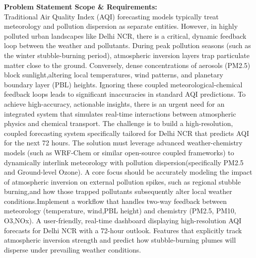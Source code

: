 \documentclass[10pt,a4paper]{article}
\begin{document}
\begin{tcolorbox}[pscard, title={"\textbf{SIH26082} \quad $\vert$ \quad Air PollutionWeather Coupled Forecasting System (Delhi NCR Focus)}]
\textbf{\color{sihnavy}Problem Statement Scope \& Requirements:}\\[0.15cm]
\noindent\small Traditional Air Quality Index (AQI) forecasting models typically treat meteorology and pollution dispersion as separate entities. However, in highly polluted urban landscapes like Delhi NCR, there is a critical, dynamic feedback loop between the weather and pollutants. During peak pollution seasons (such as the winter stubble-burning period), atmospheric inversion layers trap particulate matter close to the ground. Conversely, dense concentrations of aerosols (PM2.5) block sunlight,altering local temperatures, wind patterns, and planetary boundary layer (PBL) heights. Ignoring these coupled meteorological-chemical feedback loops leads to significant inaccuracies in standard AQI predictions. To achieve high-accuracy, actionable insights, there is an urgent need for an integrated system that simulates real-time interactions between atmospheric physics and chemical transport. The challenge is to build a high-resolution, coupled forecasting system specifically tailored for Delhi NCR that predicts AQI for the next 72 hours. The solution must leverage advanced weather-chemistry models (such as WRF-Chem or similar open-source coupled frameworks) to dynamically interlink meteorology with pollution dispersion(specifically PM2.5 and Ground-level Ozone). A core focus should be accurately modeling the impact of atmospheric inversion on external pollution spikes, such as regional stubble burning,and how those trapped pollutants subsequently alter local weather conditions.Implement a workflow that handles two-way feedback between meteorology (temperature, wind,PBL height) and chemistry (PM2.5, PM10, O3,NOx). A user-friendly, real-time dashboard displaying high-resolution AQI forecasts for Delhi NCR with a 72-hour outlook. Features that explicitly track atmospheric inversion strength and predict how stubble-burning plumes will disperse under prevailing weather conditions.\par\vspace{0.06cm}

\end{tcolorbox}
\vspace{0.4cm}
{}
\end{document}

